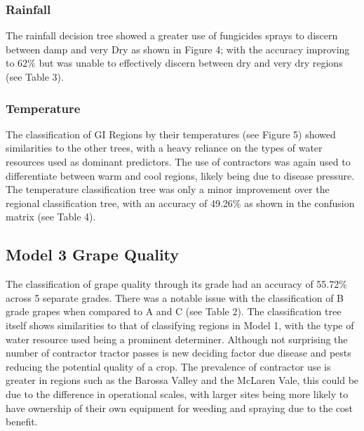 \documentclass[review,12pt,authoryear]{elsarticle}
\begin{document}
\begin{linenumbers}
\subsubsection{Rainfall}
The rainfall decision tree showed a greater use of fungicides sprays to discern between damp and very Dry as shown in Figure 4; with the accuracy improving to 62\% but was unable to effectively discern between dry and very dry regions (see Table 3).

\subsubsection{Temperature}
The classification of GI Regions by their temperatures (see Figure 5) showed similarities to the other trees, with a heavy reliance on the types of water resources used as dominant predictors. The use of contractors %
was again used to differentiate between warm and cool regions, likely being due to disease pressure. The temperature classification tree was only a minor improvement over the regional classification tree, with an accuracy of 49.26\% as shown in the confusion matrix (see Table 4).

\subsection{Model 3 Grape Quality}
The classification of grape quality through its grade %
had an accuracy of 55.72\% across 5 separate grades. There was a notable issue with the classification of B grade grapes when compared to A and C (see Table 2). %
 The classification tree itself shows similarities to that of classifying regions in Model 1, with the type of water resource used being a prominent determiner. Although not surprising the number of contractor tractor passes is new deciding factor due disease and pests reducing the potential quality of a crop. The prevalence of contractor use is greater in regions such as the Barossa Valley and the McLaren Vale, this could be due to the difference in operational scales, with larger sites being more likely to have ownership of their own equipment for weeding and spraying due to the cost benefit.


\end{linenumbers}
\end{document}
